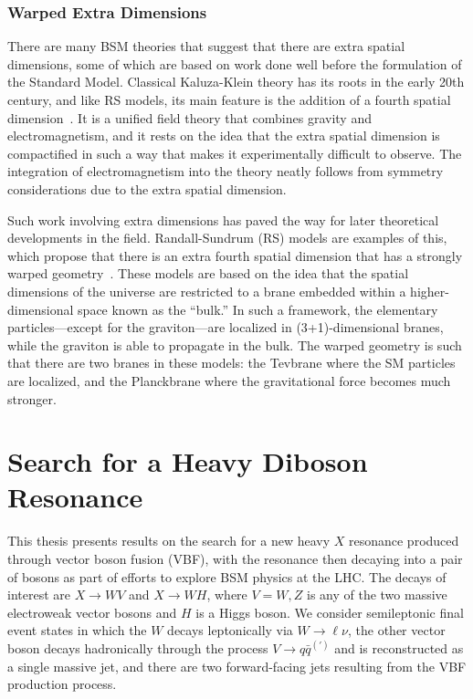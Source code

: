 \subsubsection{Warped Extra Dimensions}

There are many BSM theories that suggest that there are extra spatial dimensions, some of which are based on work done well before the formulation of the Standard Model.
Classical Kaluza-Klein theory has its roots in the early 20th century, and like RS models, its main feature is the addition of a fourth spatial dimension~\cite{1921spaw966K}.
It is a unified field theory that combines gravity and electromagnetism, and it rests on the idea that the extra spatial dimension is compactified in such a way that makes it experimentally difficult to observe.
The integration of electromagnetism into the theory neatly follows from symmetry considerations due to the extra spatial dimension.

Such work involving extra dimensions has paved the way for later theoretical developments in the field.
Randall-Sundrum (RS) models are examples of this, which propose that there is an extra fourth spatial dimension that has a strongly warped geometry~\cite{PhysRevLett.83.4690}.
These models are based on the idea that the spatial dimensions of the universe are restricted to a brane embedded within a higher-dimensional space known as the ``bulk.''
In such a framework, the elementary particles---except for the graviton---are localized in (3+1)-dimensional branes, while the graviton is able to propagate in the bulk.
The warped geometry is such that there are two branes in these models: the Tevbrane where the SM particles are localized, and the Planckbrane where the gravitational force becomes much stronger.

\section{Search for a Heavy Diboson Resonance}
\label{sec:VBF}

This thesis presents results on the search for a new heavy $X$ resonance produced through vector boson fusion (VBF), with the resonance then decaying into a pair of bosons as part of efforts to explore BSM physics at the LHC.
The decays of interest are $X\to WV$ and $X\to WH$, where $V=W,Z$ is any of the two massive electroweak vector bosons and $H$ is a Higgs boson.
We consider semileptonic final event states in which the $W$ decays leptonically via $W\to \ell\nu$, the other vector boson decays hadronically through the process $V\to q\bar{q}^{(\prime)}$ and is reconstructed as a single massive jet, and there are two forward-facing jets resulting from the VBF production process.

